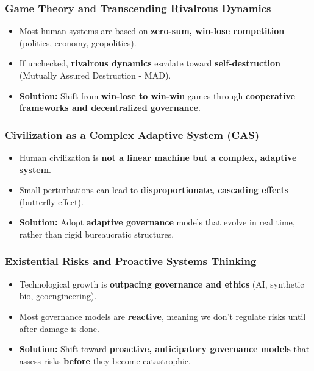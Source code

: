 \begin{frame}[fragile]\frametitle{Game Theory and Transcending Rivalrous Dynamics}
	\begin{itemize}
	\item Most human systems are based on \textbf{zero-sum, win-lose competition} (politics, economy, geopolitics).
	\item If unchecked, \textbf{rivalrous dynamics} escalate toward \textbf{self-destruction} (Mutually Assured Destruction - MAD).
	\item \textbf{Solution:} Shift from \textbf{win-lose to win-win} games through \textbf{cooperative frameworks and decentralized governance}.
	\end{itemize}
\end{frame}

\begin{frame}[fragile]\frametitle{Civilization as a Complex Adaptive System (CAS)}
	\begin{itemize}
	\item Human civilization is \textbf{not a linear machine but a complex, adaptive system}.
	\item Small perturbations can lead to \textbf{disproportionate, cascading effects} (butterfly effect).
	\item \textbf{Solution:} Adopt \textbf{adaptive governance} models that evolve in real time, rather than rigid bureaucratic structures.
	\end{itemize}
\end{frame}

\begin{frame}[fragile]\frametitle{Existential Risks and Proactive Systems Thinking}
	\begin{itemize}
	\item Technological growth is \textbf{outpacing governance and ethics} (AI, synthetic bio, geoengineering).
	\item Most governance models are \textbf{reactive}, meaning we don’t regulate risks until after damage is done.
	\item \textbf{Solution:} Shift toward \textbf{proactive, anticipatory governance models} that assess risks \textbf{before} they become catastrophic.
	\end{itemize}
\end{frame}

